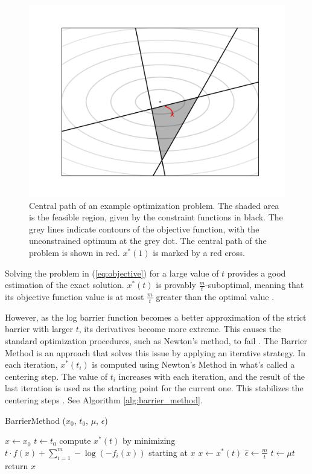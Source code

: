 \documentclass[12pt, a4paper]{report}
\begin{document}
\begin{figure}
    \centering
    \includegraphics[scale=0.6]{figs/barrier_method_example.png}
    \caption{Central path of an example optimization problem. The shaded area is the feasible region, given by the constraint functions in black. The grey lines indicate contours of the objective function, with the unconstrained optimum at the grey dot. The central path of the problem is shown in red. $x^*(1)$ is marked by a red cross.}
    \label{fig:barrier_method_example}
\end{figure}

Solving the problem in (\ref{eq:objective}) for a large value of $t$ provides a good estimation of the exact solution.
$x^*(t)$ is provably $\frac{m}{t}$-suboptimal, meaning that its objective function value is at most $\frac{m}{t}$ greater than the optimal value \cite[566]{boyd}.

However, as the log barrier function becomes a better approximation of the strict barrier with larger $t$, its derivatives become more extreme.
This causes the standard optimization procedures, such as Newton's method, to fail \cite[564]{boyd}.
The Barrier Method is an approach that solves this issue by applying an iterative strategy.
In each iteration, $x^*(t_i)$ is computed using Newton's Method in what's called a centering step.
The value of $t_i$ increases with each iteration, and the result of the last iteration is used as the starting point for the current one.
This stabilizes the centering steps \cite[569]{boyd}.
See Algorithm \ref{alg:barrier_method}.

\begin{algorithm}
    \caption[The basic Barrier Method.]{BarrierMethod ($x_0$, $t_0$, $\mu$, $\epsilon$)}
    \label{alg:barrier_method}
    \begin{algorithmic}
        \State $x \gets x_0$
        \State $t \gets t_0$
        \Repeat
            \State compute $x^*(t)$ by minimizing $t \cdot f(x) + \sum_{i=1}^m -\log(-f_i(x))$ starting at $x$
            \State $x \gets x^*(t)$
            \State $\hat{\epsilon} \gets \frac{m}{t}$
            \State $t \gets \mu t$
        \Until{$\hat{\epsilon} < \epsilon$}
        \State return $x$
    \end{algorithmic}
\end{algorithm}
\end{document}
